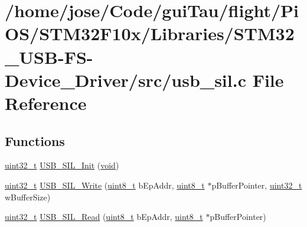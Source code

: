 \hypertarget{_s_t_m32_f10x_2_libraries_2_s_t_m32___u_s_b-_f_s-_device___driver_2src_2usb__sil_8c}{\section{/home/jose/\-Code/gui\-Tau/flight/\-Pi\-O\-S/\-S\-T\-M32\-F10x/\-Libraries/\-S\-T\-M32\-\_\-\-U\-S\-B-\/\-F\-S-\/\-Device\-\_\-\-Driver/src/usb\-\_\-sil.c File Reference}
\label{_s_t_m32_f10x_2_libraries_2_s_t_m32___u_s_b-_f_s-_device___driver_2src_2usb__sil_8c}
}
\subsection*{Functions}
\begin{DoxyCompactItemize}
\item 
\hyperlink{stdint_8h_a435d1572bf3f880d55459d9805097f62}{uint32\-\_\-t} \hyperlink{_s_t_m32_f10x_2_libraries_2_s_t_m32___u_s_b-_f_s-_device___driver_2src_2usb__sil_8c_a35769edfa7e5e32034d0c65440369cda}{U\-S\-B\-\_\-\-S\-I\-L\-\_\-\-Init} (\hyperlink{group___n_a_m_e_ga18028b8badbf1ea7e704ccac3c488e82}{void})
\item 
\hyperlink{stdint_8h_a435d1572bf3f880d55459d9805097f62}{uint32\-\_\-t} \hyperlink{_s_t_m32_f10x_2_libraries_2_s_t_m32___u_s_b-_f_s-_device___driver_2src_2usb__sil_8c_ab005324bdedc235ce1f65121467b2e72}{U\-S\-B\-\_\-\-S\-I\-L\-\_\-\-Write} (\hyperlink{stdint_8h_aba7bc1797add20fe3efdf37ced1182c5}{uint8\-\_\-t} b\-Ep\-Addr, \hyperlink{stdint_8h_aba7bc1797add20fe3efdf37ced1182c5}{uint8\-\_\-t} $\ast$p\-Buffer\-Pointer, \hyperlink{stdint_8h_a435d1572bf3f880d55459d9805097f62}{uint32\-\_\-t} w\-Buffer\-Size)
\item 
\hyperlink{stdint_8h_a435d1572bf3f880d55459d9805097f62}{uint32\-\_\-t} \hyperlink{_s_t_m32_f10x_2_libraries_2_s_t_m32___u_s_b-_f_s-_device___driver_2src_2usb__sil_8c_ab6600b124ff88cf2690b842424888629}{U\-S\-B\-\_\-\-S\-I\-L\-\_\-\-Read} (\hyperlink{stdint_8h_aba7bc1797add20fe3efdf37ced1182c5}{uint8\-\_\-t} b\-Ep\-Addr, \hyperlink{stdint_8h_aba7bc1797add20fe3efdf37ced1182c5}{uint8\-\_\-t} $\ast$p\-Buffer\-Pointer)
\end{DoxyCompactItemize}


